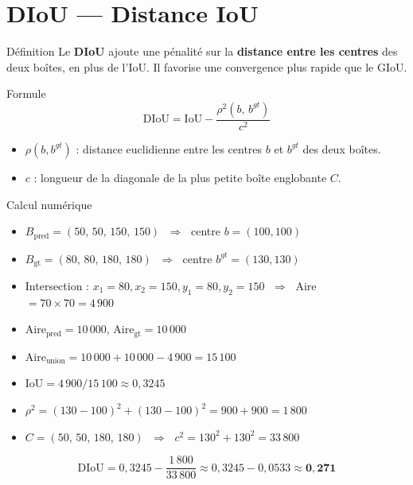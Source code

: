 \documentclass[12pt, a4paper]{report}
\newcommand{\IoU}{\text{IoU}}
\begin{document}
\section{DIoU — Distance IoU}

\begin{definitionbox}{Définition}
  Le \textbf{DIoU} ajoute une pénalité sur la \textbf{distance entre les centres}
  des deux boîtes, en plus de l'IoU. Il favorise une convergence plus rapide que
  le GIoU.
\end{definitionbox}

\begin{formulebox}{Formule}
  \[
    \text{DIoU} = \IoU - \frac{\rho^2(b,\, b^{gt})}{c^2}
  \]
  \begin{itemize}
    \item $\rho(b, b^{gt})$ : distance euclidienne entre les centres $b$ et
          $b^{gt}$ des deux boîtes.
    \item $c$ : longueur de la diagonale de la plus petite boîte englobante $C$.
  \end{itemize}
\end{formulebox}

\begin{examplebox}{Calcul numérique}
  \begin{itemize}
    \item $B_{\text{pred}} = (50,\,50,\,150,\,150)$
          $\;\Rightarrow\;$ centre $b = (100, 100)$
    \item $B_{\text{gt}} = (80,\,80,\,180,\,180)$
          $\;\Rightarrow\;$ centre $b^{gt} = (130, 130)$
    \item Intersection : $x_1=80, x_2=150, y_1=80, y_2=150$
          $\;\Rightarrow\;$ Aire $= 70 \times 70 = 4\,900$
    \item Aire$_{\text{pred}} = 10\,000$, Aire$_{\text{gt}} = 10\,000$
    \item Aire$_{\text{union}} = 10\,000 + 10\,000 - 4\,900 = 15\,100$
    \item $\IoU = 4\,900 / 15\,100 \approx 0{,}3245$
    \item $\rho^2 = (130-100)^2 + (130-100)^2 = 900 + 900 = 1\,800$
    \item $C = (50,\,50,\,180,\,180)$
          $\;\Rightarrow\;$ $c^2 = 130^2 + 130^2 = 33\,800$
  \end{itemize}
  \[
    \text{DIoU} = 0{,}3245 - \frac{1\,800}{33\,800} \approx 0{,}3245 - 0{,}0533 \approx \mathbf{0{,}271}
  \]
\end{examplebox}
\end{document}
